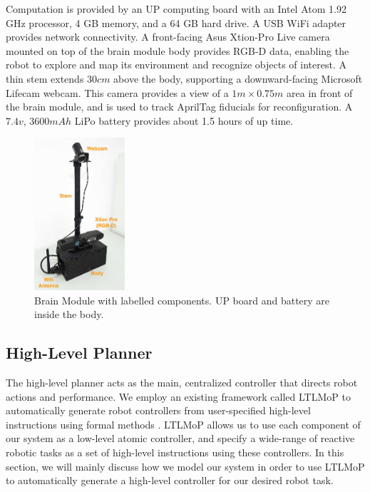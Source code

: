 \documentclass[conference]{IEEEtran}
\begin{document}
Computation is provided by an UP computing board with an Intel Atom 1.92 GHz processor, 4 GB memory, and a 64 GB hard drive. A USB WiFi adapter provides network connectivity. A front-facing Asus Xtion-Pro Live camera mounted on top of the brain module body provides RGB-D data, enabling the robot to explore and map its environment and recognize objects of interest.  A thin stem extends $30cm$ above the body, supporting a downward-facing Microsoft Lifecam webcam.  This camera provides a view of a  $1m\times0.75m$ area in front of the brain module, and is used to track AprilTag \cite{olson2011apriltag} fiducials for reconfiguration. A $7.4v$, $3600mAh$ LiPo battery provides about 1.5 hours of up time.
%
\begin{figure}
\begin{center}
\includegraphics[width=0.3\textwidth]{images/sensor_module2.jpg}
\caption{Brain Module with labelled components.  UP board and battery are inside the body.      }
\label{fig:sensor-module}
\end{center}
\vspace{-2em}
\end{figure}

%
\subsection{High-Level Planner}
\label{sec:high-level}

The high-level planner acts as the main, centralized controller that directs robot actions and performance. We employ an existing framework called LTLMoP to automatically generate robot controllers from user-specified high-level instructions using formal methods \cite{DBLP:conf/iros/FinucaneJK10,DBLP:journals/trob/Kress-GazitFP09}.
LTLMoP allows us to use each component of our system as a low-level atomic controller, and specify a wide-range of reactive robotic tasks as a set of high-level instructions using these controllers.
In this section, we will mainly discuss how we model our system in order to use LTLMoP to automatically generate a high-level controller for our desired robot task.
\end{document}
